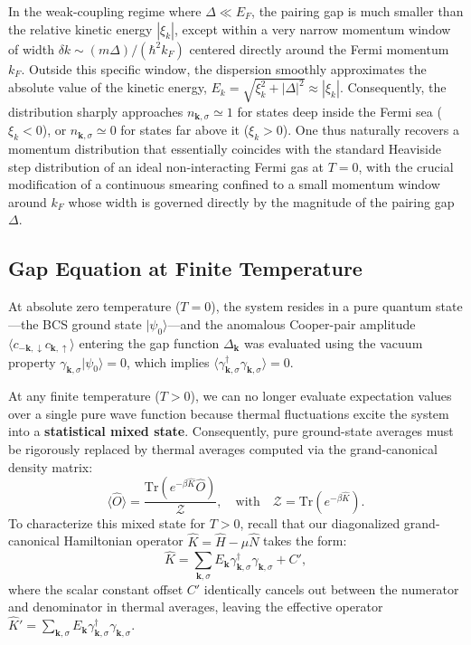 In the weak-coupling regime where \( \Delta \ll E_F \), the pairing gap is much smaller than the relative kinetic energy \( |\xi_k| \), except within a very narrow momentum window of width \( \delta k \sim (m\Delta)/(\hbar^2 k_F) \) centered directly around the Fermi momentum \( k_F \). Outside this specific window, the dispersion smoothly approximates the absolute value of the kinetic energy, \( E_k = \sqrt{\xi_k^2 + |\Delta|^2} \approx |\xi_k| \). Consequently, the distribution sharply approaches \( n_{\mathbf{k},\sigma} \simeq 1 \) for states deep inside the Fermi sea (\( \xi_k < 0 \)), or \( n_{\mathbf{k},\sigma} \simeq 0 \) for states far above it (\( \xi_k > 0 \)). One thus naturally recovers a momentum distribution that essentially coincides with the standard Heaviside step distribution of an ideal non-interacting Fermi gas at \( T = 0 \), with the crucial modification of a continuous smearing confined to a small momentum window around \( k_F \) whose width is governed directly by the magnitude of the pairing gap \( \Delta \).

\subsection{Gap Equation at Finite Temperature}

At absolute zero temperature (\( T = 0 \)), the system resides in a pure quantum state—the BCS ground state \( |\psi_0\rangle \)—and the anomalous Cooper-pair amplitude \( \langle c_{-\mathbf{k},\downarrow} c_{\mathbf{k},\uparrow} \rangle \) entering the gap function \( \Delta_{\mathbf{k}} \) was evaluated using the vacuum property \( \gamma_{\mathbf{k},\sigma} |\psi_0\rangle = 0 \), which implies \( \langle \gamma_{\mathbf{k},\sigma}^\dagger \gamma_{\mathbf{k},\sigma} \rangle = 0 \).

At any finite temperature (\( T > 0 \)), we can no longer evaluate expectation values over a single pure wave function because thermal fluctuations excite the system into a \textbf{statistical mixed state}. Consequently, pure ground-state averages must be rigorously replaced by thermal averages computed via the grand-canonical density matrix:
\[
    \langle \hat{O} \rangle = \frac{\text{Tr}\left( e^{-\beta \hat{K}} \hat{O} \right)}{\mathcal{Z}}, \quad \text{with} \quad \mathcal{Z} = \text{Tr}\left( e^{-\beta \hat{K}} \right).
\]
To characterize this mixed state for \( T > 0 \), recall that our diagonalized grand-canonical Hamiltonian operator \( \hat{K} = \hat{H} - \mu \hat{N} \) takes the form:
\[
    \hat{K} = \sum_{\mathbf{k},\sigma} E_{\mathbf{k}} \gamma_{\mathbf{k},\sigma}^\dagger \gamma_{\mathbf{k},\sigma} + C',
\]
where the scalar constant offset \( C' \) identically cancels out between the numerator and denominator in thermal averages, leaving the effective operator \( \hat{K}' = \sum_{\mathbf{k},\sigma} E_{\mathbf{k}} \gamma_{\mathbf{k},\sigma}^\dagger \gamma_{\mathbf{k},\sigma} \).

